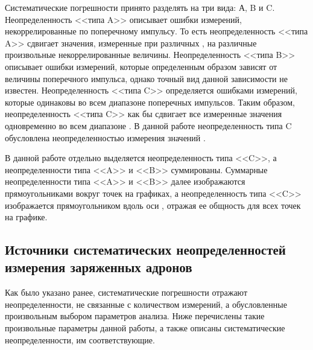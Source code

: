 
Систематические погрешности принято разделять на три вида: А, B и C.
Неопределенность <<типа A>> описывает ошибки измерений, некоррелированные по поперечному импульсу. То есть неопределенность <<типа A>> сдвигает значения, измеренные при различных \pt, на различные произвольные некоррелированные величины. 
Неопределенность <<типа B>> описывает ошибки измерений, которые определенным образом зависят от величины поперечного импульса, однако точный вид данной зависимости не известен. 
Неопределенность <<типа C>> определяется ошибками измерений, которые одинаковы во всем диапазоне поперечных импульсов. Таким образом, неопределенность <<типа C>> как бы сдвигает все измеренные значения одновременно во всем диапазоне \pt. В данной работе неопределенность типа C обусловлена неопределенностью измерения значений \Ncoll.

В данной работе отдельно выделяется неопределенность типа <<C>>, а неопределенности типа <<A>> и <<B>> суммированы. Суммарные неопределенности типа <<A>> и <<B>> далее изображаются прямоугольниками вокруг точек на графиках, а неопределенность типа <<C>> изображается прямоугольником вдоль оси \pt, отражая ее общность для всех точек на графике. 

\subsection{Источники систематических неопределенностей измерения заряженных адронов} \label{sect3:SystSource}
Как было указано ранее, систематические погрешности отражают неопределенности, не связанные с количеством измерений, а обусловленные произвольным выбором параметров анализа. Ниже перечислены такие произвольные параметры данной работы, а также описаны систематические неопределенности, им соответствующие.


